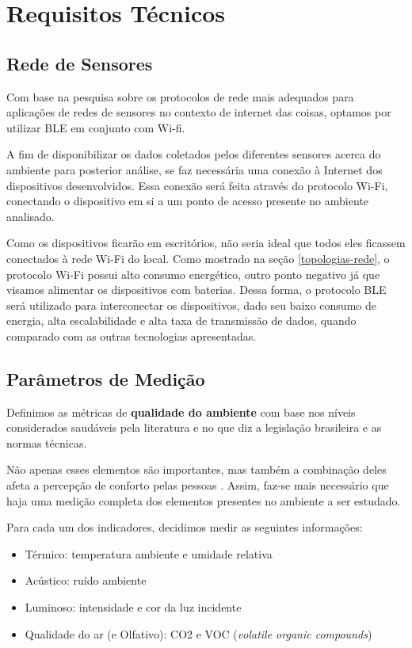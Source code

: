 \documentclass[../monografia.tex]{subfiles}
\begin{document}
\section{Requisitos Técnicos}

\subsection{Rede de Sensores}

Com base na pesquisa sobre os protocolos de rede mais adequados para aplicações de redes de sensores no contexto de internet das coisas, optamos por utilizar BLE em conjunto com Wi-fi. 

A fim de disponibilizar os dados coletados pelos diferentes sensores acerca do ambiente para posterior análise, se faz necessária uma conexão à Internet dos dispositivos desenvolvidos. Essa conexão será feita através do protocolo Wi-Fi, conectando o dispositivo em si a um ponto de acesso presente no ambiente analisado.

Como os dispositivos ficarão em escritórios, não seria ideal que todos eles ficassem conectados à rede Wi-Fi do local. Como mostrado na seção \ref{topologias-rede}, o protocolo Wi-Fi possui alto consumo energético, outro ponto negativo já que visamos alimentar os dispositivos com baterias. Dessa forma, o protocolo BLE será utilizado para interconectar os dispositivos, dado seu baixo consumo de energia, alta escalabilidade e alta taxa de transmissão de dados, quando comparado com as outras tecnologias apresentadas.

\subsection{Parâmetros de Medição} \label{specs-parametros}

Definimos as métricas de \textbf{qualidade do ambiente} com base nos níveis considerados saudáveis pela literatura e no que diz a legislação brasileira e as normas técnicas. 

Não apenas esses elementos são importantes, mas também a combinação deles afeta a percepção de conforto pelas pessoas \cite{ComfortOffice}. Assim, faz-se mais necessário que haja uma medição completa dos elementos presentes no ambiente a ser estudado.  

Para cada um dos indicadores, decidimos medir as seguintes informações:

\begin{itemize}
\item Térmico: temperatura ambiente e umidade relativa
\item Acústico: ruído ambiente
\item Luminoso: intensidade e cor da luz incidente
\item Qualidade do ar (e Olfativo): CO2 e VOC (\textit{volatile organic compounds})
\end{itemize}
\end{document}
